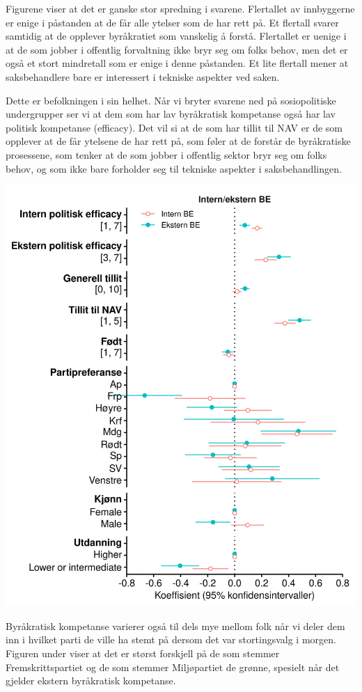 \documentclass[
]{book}
\begin{document}
Figurene viser at det er ganske stor spredning i svarene.
Flertallet av innbyggerne er enige i påstanden at de får alle ytelser som de har rett på.
Et flertall svarer samtidig at de opplever byråkratiet som vanskelig å forstå.
Flertallet er uenige i at de som jobber i offentlig forvaltning ikke bryr seg om folks behov, men det er også et stort mindretall som er enige i denne påstanden.
Et lite flertall mener at saksbehandlere bare er interessert i tekniske aspekter ved saken.

Dette er befolkningen i sin helhet.
Når vi bryter svarene ned på sosiopolitiske undergrupper ser vi at dem som har lav byråkratisk kompetanse også har lav politisk kompetanse (efficacy).
Det vil si at de som har tillit til NAV er de som opplever at de får ytelsene de har rett på, som føler at de forstår de byråkratiske prosessene, som tenker at de som jobber i offentlig sektor bryr seg om folks behov, og som ikke bare forholder seg til tekniske aspekter i saksbehandlingen.

\includegraphics{figs/png/fig_be_coefs_by_type.png}

Byråkratisk kompetanse varierer også til dels mye mellom folk når vi deler dem inn i hvilket parti de ville ha stemt på dersom det var stortingsvalg i morgen.
Figuren under viser at det er størst forskjell på de som stemmer Fremskrittspartiet og de som stemmer Miljøpartiet de grønne, spesielt når det gjelder ekstern byråkratisk kompetanse.
\end{document}
